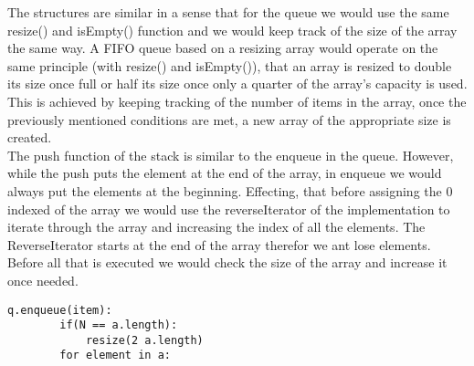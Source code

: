 \documentclass[a4paper]{article}
\begin{document}
The structures are similar in a sense that for the queue we would use the same resize() and isEmpty() function and we would keep track of the size of the array the same way.
\noindent
A FIFO queue based on a resizing array would operate on the same principle (with resize() and isEmpty()), that an array is resized 
to double its size once full or half its size once only a quarter of the array's capacity is used. This is achieved by keeping tracking of 
the number of items in the array, once the previously mentioned conditions are met, a new array 
of the appropriate size is created.
\ \\

\noindent
The push function of the stack is similar to the enqueue in the queue. However, while the push puts the element at the end of the array, in enqueue we would always put the elements at the beginning. Effecting, that before assigning  the 0 indexed of the array we would use the reverseIterator of the implementation to iterate through the array and increasing the index of all the elements. The ReverseIterator starts at the end of the array therefor we ant lose elements.
\ \\

\noindent
Before all that is executed we would check the size of the array and increase it once needed.

\begin{lstlisting}[escapeinside={{*}{*}}]
    q.enqueue(item):
    	if(N == a.length):
    		resize(2 a.length)
    	for element in a:
    		
\end{lstlisting}
\end{document}

